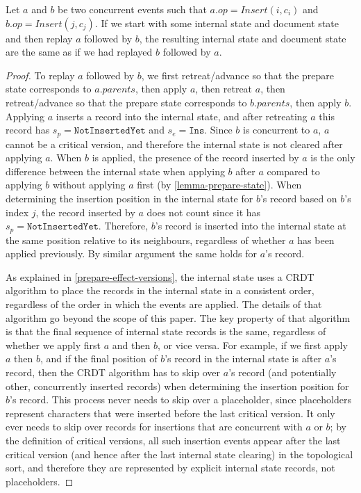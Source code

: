 \documentclass[sigplan,10pt]{acmart}
\begin{document}
\begin{lemma}\label{lemma-ins-ins}
  Let $a$ and $b$ be two concurrent events such that $a.\mathit{op} = \mathit{Insert}(i, c_i)$ and $b.\mathit{op} = \mathit{Insert}(j, c_j)$.
  If we start with some internal state and document state and then replay $a$ followed by $b$, the resulting internal state and document state are the same as if we had replayed $b$ followed by $a$.
\end{lemma}
\begin{proof}
  To replay $a$ followed by $b$, we first retreat/advance so that the prepare state corresponds to $a.\mathit{parents}$, then apply $a$, then retreat $a$, then retreat/advance so that the prepare state corresponds to $b.\mathit{parents}$, then apply $b$.
  Applying $a$ inserts a record into the internal state, and after retreating $a$ this record has $s_p = \texttt{NotInsertedYet}$ and $s_e = \texttt{Ins}$.
  Since $b$ is concurrent to $a$, $a$ cannot be a critical version, and therefore the internal state is not cleared after applying $a$.
  When $b$ is applied, the presence of the record inserted by $a$ is the only difference between the internal state when applying $b$ after $a$ compared to applying $b$ without applying $a$ first (by \autoref{lemma-prepare-state}).
  When determining the insertion position in the internal state for $b$'s record based on $b$'s index $j$, the record inserted by $a$ does not count since it has $s_p = \texttt{NotInsertedYet}$.
  Therefore, $b$'s record is inserted into the internal state at the same position relative to its neighbours, regardless of whether $a$ has been applied previously.
  By similar argument the same holds for $a$'s record.

  As explained in \autoref{prepare-effect-versions}, the internal state uses a CRDT algorithm to place the records in the internal state in a consistent order, regardless of the order in which the events are applied.
  The details of that algorithm go beyond the scope of this paper.
  The key property of that algorithm is that the final sequence of internal state records is the same, regardless of whether we apply first $a$ and then $b$, or vice versa.
  For example, if we first apply $a$ then $b$, and if the final position of $b$'s record in the internal state is after $a$'s record, then the CRDT algorithm has to skip over $a$'s record (and potentially other, concurrently inserted records) when determining the insertion position for $b$'s record.
  This process never needs to skip over a placeholder, since placeholders represent characters that were inserted before the last critical version.
  It only ever needs to skip over records for insertions that are concurrent with $a$ or $b$; by the definition of critical versions, all such insertion events appear after the last critical version (and hence after the last internal state clearing) in the topological sort, and therefore they are represented by explicit internal state records, not placeholders.


\end{proof}
\end{document}
